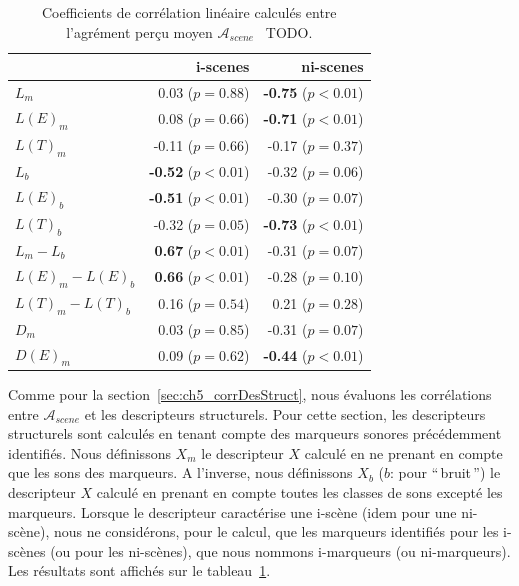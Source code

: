 \begin{table}[t]
\centering
\begin{tabular}{l r r} 
                  &   i-scenes                  & ni-scenes \\
\hline
$L_m$              & 0.03  ($p=0.88$)           & \textbf{-0.75} ($p<0.01$) \\
$L(E)_m$           & 0.08  ($p=0.66$)           & \textbf{-0.71} ($p<0.01$) \\
$L(T)_m$           & -0.11 ($p=0.66$)           & -0.17 ($p=0.37$) \\
$L_b$              & \textbf{-0.52} ($p<0.01$)  & -0.32 ($p=0.06$) \\
$L(E)_b$           & \textbf{-0.51} ($p<0.01$)  & -0.30 ($p=0.07$) \\
$L(T)_b$           & -0.32 ($p=0.05$)           & \textbf{-0.73} ($p<0.01$) \\
$L_m-L_b$          & \textbf{0.67} ($p<0.01$)   & -0.31 ($p=0.07$) \\
$L(E)_m-L(E)_b$    & \textbf{0.66} ($p<0.01$)   & -0.28 ($p=0.10$) \\
$L(T)_m-L(T)_b$    & 0.16 ($p=0.54$)            & 0.21 ($p=0.28$) \\
$D_m$              & 0.03 ($p=0.85$)            & -0.31 ($p=0.07$) \\
$D(E)_m$           & 0.09 ($p=0.62$)            & \textbf{-0.44} ($p<0.01$) \\
\hline
\end{tabular}
\vspace{0.5mm}
\caption{Coefficients de corrélation linéaire calculés entre l'agrément perçu moyen $\mathcal{A}_{scene}$ \vs~TODO.}
\label{tab:corrMarkers}
\end{table}

Comme pour la  section~\ref{sec:ch5_corrDesStruct}, nous évaluons les corrélations entre $\mathcal{A}_{scene}$ et les descripteurs structurels. Pour cette section, les descripteurs structurels sont calculés en tenant compte des marqueurs sonores précédemment identifiés. Nous définissons $X_m$ le descripteur $X$ calculé en ne prenant en compte que les sons des marqueurs. A l'inverse, nous définissons $X_b$ ($b$: pour ``\,bruit\,'') le descripteur $X$ calculé en prenant en compte toutes les classes de sons excepté les marqueurs. Lorsque le descripteur caractérise une i-scène (idem pour une ni-scène), nous ne considérons, pour le calcul, que les marqueurs identifiés pour les i-scènes (ou pour les ni-scènes), que nous nommons i-marqueurs (ou ni-marqueurs). Les résultats sont affichés sur le tableau~\ref{tab:corrMarkers}.


